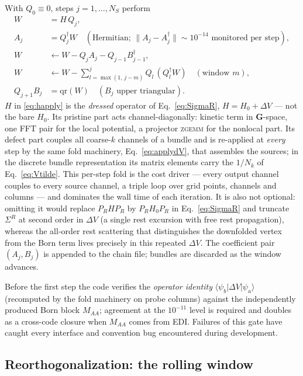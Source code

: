 \documentclass[aps,prx,reprint,superscriptaddress,nofootinbib,longbibliography]{revtex4-2}
\newcommand{\dV}{\Delta V}
\newcommand{\GG}{\mathbf{G}}
\begin{document}
With $Q_0\equiv0$, steps $j=1,\dots,N_S$ perform
\begin{align}
  W &= H\,Q_j ,\label{eq:happly}\\
  A_j &= Q_j^{\dagger}W
     \quad(\text{Hermitian; } \|A_j-A_j^{\dagger}\|\sim10^{-14}
     \text{ monitored per step}),\nonumber\\
  W &\leftarrow W - Q_jA_j - Q_{j-1}B_{j-1}^{\dagger},\nonumber\\
  W &\leftarrow W - \sum_{l=\max(1,\,j-m)}^{j} Q_l\,(Q_l^{\dagger}W)
     \quad(\text{window }m),\label{eq:reorth}\\
  Q_{j+1}B_j &= \mathrm{qr}(W)\quad(B_j\text{ upper triangular}).
  \label{eq:qrj}
\end{align}
$H$ in \eqref{eq:happly} is the \emph{dressed} operator of
Eq.~\eqref{eq:SigmaR}, $H = H_0 + \dV$ --- not the bare $H_0$. Its pristine
part acts channel-diagonally: kinetic term in $\GG$-space, one FFT pair for
the local potential, a projector \textsc{zgemm} for the nonlocal part. Its
defect part couples all coarse-$k$ channels of a bundle and is re-applied at
\emph{every} step by the same fold machinery, Eq.~\eqref{eq:applydV}, that
assembles the sources; in the discrete bundle representation its matrix
elements carry the $1/N_k$ of Eq.~\eqref{eq:Vtilde}. This per-step fold is
the cost driver --- every output channel couples to every source channel, a
triple loop over grid points, channels and columns --- and dominates the
wall time of each iteration. It is also not optional: omitting it would
replace $P_R H P_R$ by $P_R H_0 P_R$ in Eq.~\eqref{eq:SigmaR} and truncate
$\Sigma^R$ at second order in $\dV$ (a single rest excursion with free rest
propagation), whereas the all-order rest scattering that distinguishes the
downfolded vertex from the Born term lives precisely in this repeated
$\dV$. The coefficient pair $(A_j,B_j)$ is appended to the chain file;
bundles are discarded as the window advances.

Before the first step the code verifies the \emph{operator identity}
$\langle\psi_b|\dV|\psi_a\rangle$ (recomputed by the fold machinery on probe
columns) against the independently produced Born block $M_{AA}$; agreement at
the $10^{-11}$ level is required and doubles as a cross-code closure when
$M_{AA}$ comes from EDI. Failures of this gate have caught every interface
and convention bug encountered during development.

\subsection{Reorthogonalization: the rolling window}
\end{document}
